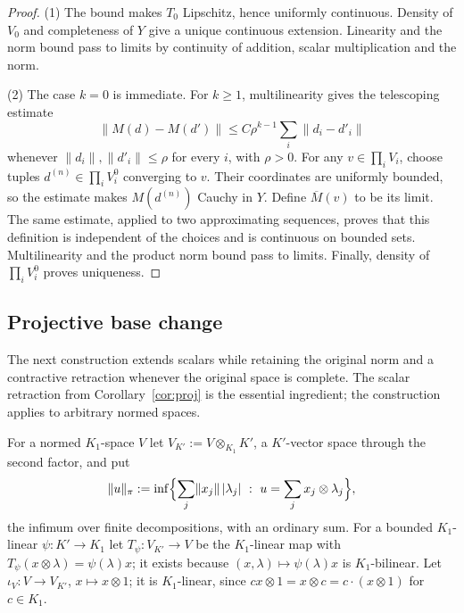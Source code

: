 \documentclass[11pt]{amsart}
\theoremstyle{definition}
\theoremstyle{remark}
\numberwithin{equation}{section}
\newcommand{\abs}[1]{\lvert #1\rvert}
\newcommand{\norm}[1]{\lVert #1\rVert}
\begin{document}
\begin{proof}
(1) The bound makes $T_0$ Lipschitz, hence uniformly continuous. Density of $V_0$ and completeness of $Y$ give a
unique continuous extension. Linearity and the norm bound pass to limits by continuity of addition, scalar
multiplication and the norm.

(2) The case $k=0$ is immediate. For $k\ge1$, multilinearity gives the telescoping estimate
\[
\norm{M(d)-M(d')}\le C\rho^{k-1}\sum_i\norm{d_i-d'_i}
\]
whenever $\norm{d_i},\norm{d'_i}\le\rho$ for every $i$, with $\rho>0$. For any $v\in\prod_iV_i$, choose tuples
$d^{(n)}\in\prod_iV_i^0$ converging to $v$. Their coordinates are uniformly bounded, so the estimate makes
$M(d^{(n)})$ Cauchy in $Y$. Define $\overline M(v)$ to be its limit. The same estimate, applied to two approximating
sequences, proves that this definition is independent of the choices and is continuous on bounded sets.
Multilinearity and the product norm bound pass to limits. Finally, density of $\prod_iV_i^0$ proves uniqueness.
\end{proof}

\subsection{Projective base change}
The next construction extends scalars while retaining the original norm and a contractive retraction whenever
the original space is complete. The scalar retraction from Corollary~\ref{cor:proj} is the essential ingredient;
the construction applies to arbitrary normed spaces.

For a normed $K_1$\nobreakdash-space $V$ let $V_{K'}:=V\otimes_{K_1}K'$, a $K'$\nobreakdash-vector space through the second factor, and put
\[
\norm u_\pi:=\inf\Bigl\{\sum_j\norm{x_j}\,\abs{\lambda_j}\ :\ u=\sum_jx_j\otimes\lambda_j\Bigr\},
\]
the infimum over finite decompositions, with an ordinary sum. For a bounded $K_1$\nobreakdash-linear $\psi\colon K'\to K_1$ let
$T_\psi\colon V_{K'}\to V$ be the $K_1$\nobreakdash-linear map with $T_\psi(x\otimes\lambda)=\psi(\lambda)x$; it exists because
$(x,\lambda)\mapsto\psi(\lambda)x$ is $K_1$\nobreakdash-bilinear. Let $\iota_V\colon V\to V_{K'}$, $x\mapsto x\otimes1$; it is
$K_1$\nobreakdash-linear, since $cx\otimes1=x\otimes c=c\cdot(x\otimes1)$ for $c\in K_1$.
\end{document}
